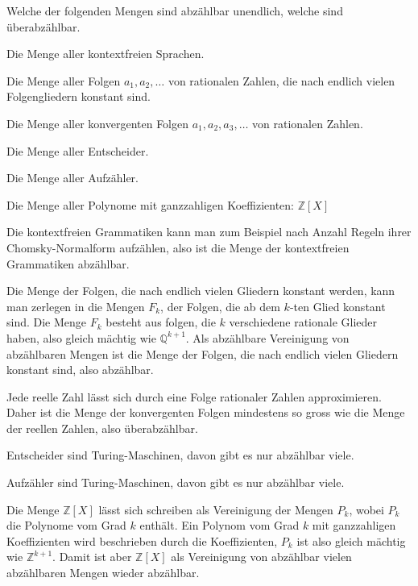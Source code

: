 Welche der folgenden Mengen sind abzählbar unendlich, welche sind
überabzählbar.
\begin{teilaufgaben}
\item Die Menge aller kontextfreien Sprachen.
\item Die Menge aller Folgen $a_1,a_2,\dots$ von rationalen Zahlen,
die nach endlich vielen Folgengliedern konstant sind.
\item Die Menge aller konvergenten Folgen $a_1,a_2,a_3,\dots$ von
rationalen Zahlen.
\item Die Menge aller Entscheider.
\item Die Menge aller Aufzähler.
\item Die Menge aller Polynome mit ganzzahligen Koeffizienten:
${\mathbb Z}[X]$
\end{teilaufgaben}


\begin{loesung}
\begin{teilaufgaben}
\item Die kontextfreien Grammatiken kann man zum Beispiel nach
Anzahl Regeln ihrer Chomsky-Normalform aufzählen, also ist
die Menge der kontextfreien Grammatiken abzählbar.
\item Die Menge der Folgen, die nach endlich vielen Gliedern konstant
werden, kann man zerlegen in die Mengen $F_k$, der Folgen, die ab dem
$k$-ten Glied konstant sind. Die Menge $F_k$ besteht aus folgen, die
$k$ verschiedene rationale Glieder haben, also gleich mächtig wie
$\mathbb Q^{k+1}$. Als abzählbare Vereinigung von abzählbaren Mengen
ist die Menge der Folgen, die nach endlich vielen Gliedern konstant sind,
also abzählbar.
\item Jede reelle Zahl lässt sich durch eine Folge rationaler Zahlen
approximieren. Daher ist die Menge der konvergenten Folgen mindestens
so gross wie die Menge der reellen Zahlen, also überabzählbar.
\item Entscheider sind Turing-Maschinen, davon gibt es nur abzählbar viele.
\item Aufzähler sind Turing-Maschinen, davon gibt es nur abzählbar viele.
\item Die Menge ${\mathbb Z}[X]$ lässt sich schreiben als Vereinigung
der Mengen $P_k$, wobei $P_k$ die Polynome vom Grad $k$ enthält.
Ein Polynom vom Grad $k$ mit ganzzahligen Koeffizienten wird beschrieben
durch die Koeffizienten, $P_k$ ist also gleich mächtig wie $\mathbb Z^{k+1}$.
Damit ist aber ${\mathbb Z}[X]$ als Vereinigung von abzählbar vielen
abzählbaren Mengen wieder abzählbar.
\qedhere
\end{teilaufgaben}
\end{loesung}

